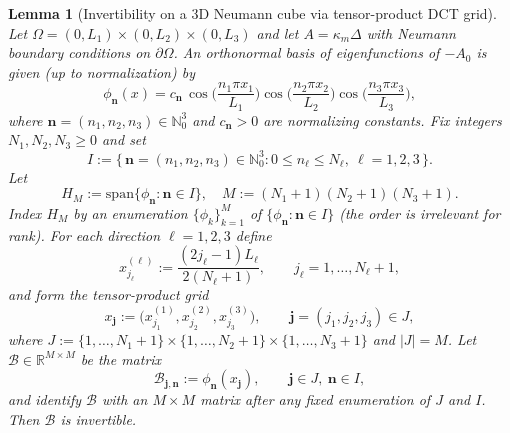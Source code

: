 \documentclass[11pt,a4paper]{article}
\numberwithin{equation}{section}
\newtheorem{lemma}[theorem]{Lemma}
\theoremstyle{definition}
\newcommand{\1}{\mathbbm{1}}
\begin{document}
\begin{lemma}[Invertibility on a 3D Neumann cube via tensor-product DCT grid]
\label{lem:rank-3D}
Let $\Omega=(0,L_1)\times(0,L_2)\times(0,L_3)$ and let
$A=\kappa_m\Delta$ with Neumann boundary conditions on $\partial\Omega$.
An orthonormal basis of eigenfunctions of $-A_0$ is given (up to
normalization) by
\[
\phi_{\mathbf{n}}(x)
= c_{\mathbf{n}}\,
\cos\!\Big(\frac{n_1\pi x_1}{L_1}\Big)
\cos\!\Big(\frac{n_2\pi x_2}{L_2}\Big)
\cos\!\Big(\frac{n_3\pi x_3}{L_3}\Big),
\]
where $\mathbf{n}=(n_1,n_2,n_3)\in\mathbb{N}_0^3$ and $c_{\mathbf{n}}>0$ are
normalizing constants.
\newline
Fix integers $N_1,N_2,N_3\ge0$ and set
\[
I := \{\,\mathbf{n}=(n_1,n_2,n_3)\in\mathbb{N}_0^3 : 0\le n_\ell\le N_\ell,
\ \ell=1,2,3 \,\}.
\]
Let
\[
H_M := \mathrm{span}\{\phi_{\mathbf{n}} : \mathbf{n}\in I\},
\quad M:=(N_1+1)(N_2+1)(N_3+1).
\]
Index $H_M$ by an enumeration $\{\phi_k\}_{k=1}^M$ of $\{\phi_{\mathbf{n}} :
\mathbf{n}\in I\}$ (the order is irrelevant for rank). For each direction
$\ell=1,2,3$ define
\[
x^{(\ell)}_{j_\ell} := \frac{(2j_\ell-1)L_\ell}{2(N_\ell+1)},
\qquad j_\ell=1,\dots,N_\ell+1,
\]
and form the tensor-product grid
\[
x_{\mathbf{j}}
:= \big(x^{(1)}_{j_1},x^{(2)}_{j_2},x^{(3)}_{j_3}\big),
\qquad
\mathbf{j}=(j_1,j_2,j_3)\in J,
\]
where $J:=\{1,\dots,N_1+1\}\times\{1,\dots,N_2+1\}\times\{1,\dots,N_3+1\}$
and $|J|=M$.
\newline
Let $\mathcal{B}\in\mathbb{R}^{M\times M}$ be the matrix
\[
\mathcal{B}_{\mathbf{j},\mathbf{n}} := \phi_{\mathbf{n}}(x_{\mathbf{j}}),
\qquad \mathbf{j}\in J,\ \mathbf{n}\in I,
\]
and identify $\mathcal{B}$ with an $M\times M$ matrix after any fixed
enumeration of $J$ and $I$. Then $\mathcal{B}$ is invertible.
\end{lemma}
\end{document}
